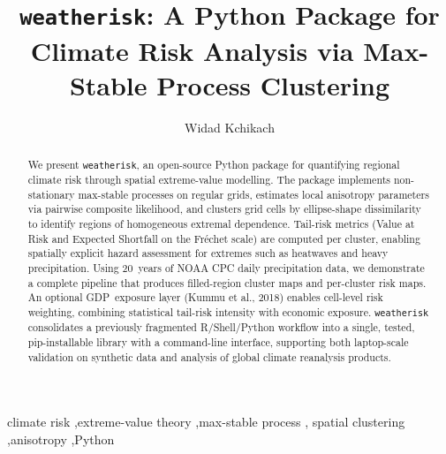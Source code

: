 \documentclass[a4paper]{elsarticle}
\begin{document}
\begin{frontmatter}

\title{\texttt{weatherisk}: A Python Package for Climate Risk Analysis via Max-Stable Process Clustering}

\author[awi]{Widad Kchikach}


\begin{abstract}
We present \texttt{weatherisk}, an open-source Python package for quantifying
regional climate risk through spatial extreme-value modelling.
The package implements non-stationary max-stable processes on regular grids,
estimates local anisotropy parameters via pairwise composite likelihood,
and clusters grid cells by ellipse-shape dissimilarity to identify regions
of homogeneous extremal dependence.
Tail-risk metrics (Value at Risk and Expected Shortfall on the Fr\'{e}chet scale)
are computed per cluster, enabling spatially explicit hazard assessment
for extremes such as heatwaves and heavy precipitation.
Using 20~years of NOAA CPC daily precipitation data, we demonstrate a
complete pipeline that produces filled-region cluster maps and per-cluster
risk maps.
An optional GDP~exposure layer (Kummu et al., 2018) enables cell-level
risk weighting, combining statistical tail-risk intensity with economic exposure.
\texttt{weatherisk} consolidates a previously fragmented R/Shell/Python workflow into a single,
tested, pip-installable library with a command-line interface, supporting both
laptop-scale validation on synthetic data and analysis of global climate
reanalysis products.
\end{abstract}

\begin{keyword}
climate risk \sep extreme-value theory \sep max-stable process \sep
spatial clustering \sep anisotropy \sep Python
\end{keyword}

\end{frontmatter}
\end{document}
